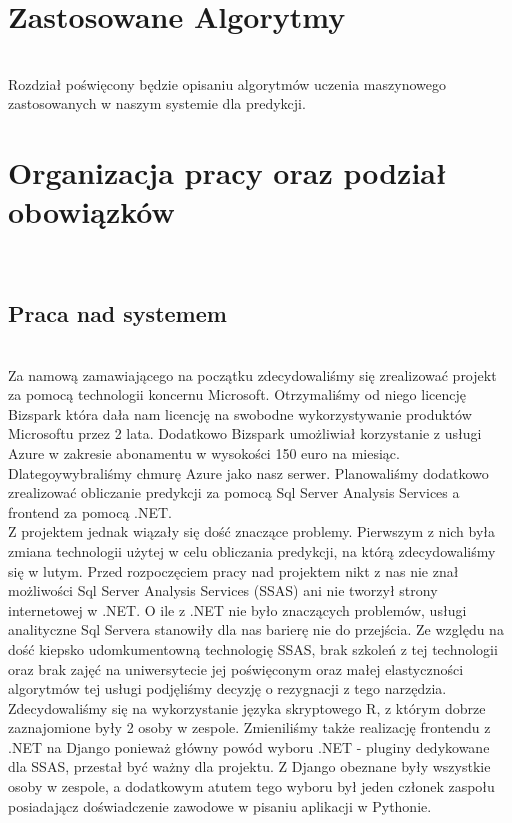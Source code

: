 \documentclass[licencjacka]{pracamgr}
\begin{document}
\chapter{Zastosowane Algorytmy}
~\\ \indent Rozdział poświęcony będzie opisaniu algorytmów uczenia maszynowego zastosowanych w naszym systemie dla predykcji.

\chapter{Organizacja pracy oraz podział obowiązków} ~\\

\section{Praca nad systemem} ~\\

Za namową zamawiającego na początku zdecydowaliśmy się zrealizować projekt za pomocą technologii koncernu Microsoft. Otrzymaliśmy od niego licencję Bizspark która dała nam licencję na swobodne wykorzystywanie produktów Microsoftu przez 2 lata. Dodatkowo Bizspark umożliwiał korzystanie z usługi Azure w zakresie abonamentu w wysokości 150 euro na miesiąc. Dlategoywybraliśmy chmurę Azure jako nasz serwer. Planowaliśmy dodatkowo zrealizować obliczanie predykcji za pomocą Sql Server Analysis Services a frontend za pomocą .NET. \\

Z projektem jednak wiązały się dość znaczące problemy. Pierwszym z nich była zmiana technologii użytej w celu obliczania predykcji, na którą zdecydowaliśmy się w lutym. Przed rozpoczęciem pracy nad projektem nikt z nas nie znał możliwości Sql Server Analysis Services (SSAS) ani nie tworzył strony internetowej w .NET. O ile z .NET nie było znaczących problemów, usługi analityczne Sql Servera stanowiły dla nas barierę nie do przejścia. Ze względu na dość kiepsko udomkumentowną technologię SSAS, brak szkoleń z tej technologii oraz brak zajęć na uniwersytecie jej poświęconym oraz małej elastyczności algorytmów tej usługi podjęliśmy decyzję o rezygnacji z tego narzędzia. Zdecydowaliśmy się na wykorzystanie języka skryptowego R, z którym dobrze zaznajomione były 2 osoby w zespole. Zmieniliśmy także realizację frontendu z .NET na Django ponieważ główny powód wyboru .NET - pluginy dedykowane dla SSAS, przestał być ważny dla projektu. Z Django obeznane były wszystkie osoby w zespole, a dodatkowym atutem tego wyboru był jeden członek zaspołu posiadającz doświadczenie zawodowe w pisaniu aplikacji w Pythonie. \\
\end{document}
